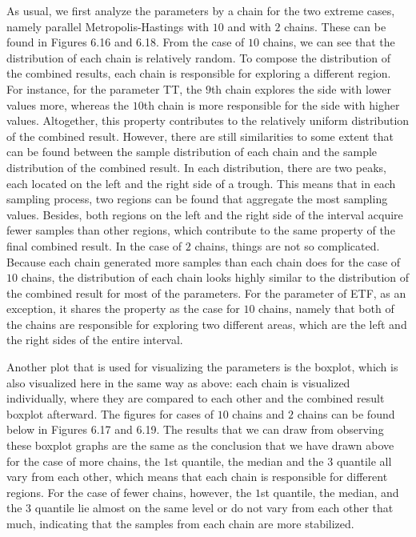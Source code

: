 As usual, we first analyze the parameters by a chain for the two extreme cases, namely parallel Metropolis-Hastings with $10$ and with $2$ chains. These can be found in Figures 6.16 and 6.18. From the case of $10$ chains, we can see that the distribution of each chain is relatively random. To compose the distribution of the combined results, each chain is responsible for exploring a different region. For instance, for the parameter TT, the $9$th chain explores the side with lower values more, whereas the $10$th chain is more responsible for the side with higher values. Altogether, this property contributes to the relatively uniform distribution of the combined result. However, there are still similarities to some extent that can be found between the sample distribution of each chain and the sample distribution of the combined result. In each distribution, there are two peaks, each located on the left and the right side of a trough. This means that in each sampling process, two regions can be found that aggregate the most sampling values. Besides, both regions on the left and the right side of the interval acquire fewer samples than other regions, which contribute to the same property of the final combined result. In the case of $2$ chains, things are not so complicated. Because each chain generated more samples than each chain does for the case of $10$ chains, the distribution of each chain looks highly similar to the distribution of the combined result for most of the parameters. For the parameter of ETF, as an exception, it shares the property as the case for $10$ chains, namely that both of the chains are responsible for exploring two different areas, which are the left and the right sides of the entire interval.

Another plot that is used for visualizing the parameters is the boxplot, which is also visualized here in the same way as above: each chain is visualized individually, where they are compared to each other and the combined result boxplot afterward. The figures for cases of $10$ chains and $2$ chains can be found below in Figures 6.17 and 6.19. The results that we can draw from observing these boxplot graphs are the same as the conclusion that we have drawn above for the case of more chains, the $1$st quantile, the median and the $3$ quantile all vary from each other, which means that each chain is responsible for different regions. For the case of fewer chains, however, the $1$st quantile, the median, and the $3$ quantile lie almost on the same level or do not vary from each other that much, indicating that the samples from each chain are more stabilized. 

